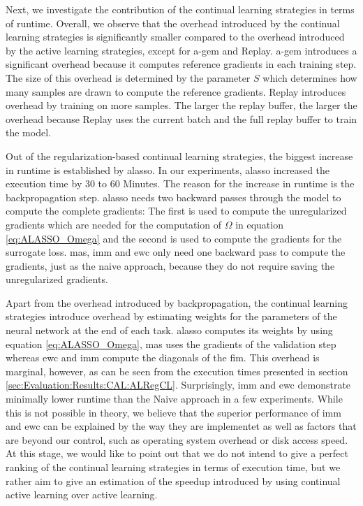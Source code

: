 Next, we investigate the contribution of the continual learning strategies in terms of runtime. Overall, we observe that the overhead introduced by the
continual learning strategies is significantly smaller compared to the overhead introduced by the active learning strategies, except for \gls{a-gem}
and Replay. \gls{a-gem} introduces a significant overhead because it computes reference gradients in each training step. The size of this overhead is
determined by the parameter $S$ which determines how many samples are drawn to compute the reference gradients. Replay introduces overhead by training
on more samples. The larger the replay buffer, the larger the overhead because Replay uses the current batch and the full replay buffer to train the model.

Out of the regularization-based continual learning strategies, the biggest increase in runtime is established by \gls{alasso}. In our experiments,
\gls{alasso} increased the execution time by 30 to 60 Minutes. The reason for the increase in runtime is the backpropagation step. \gls{alasso} needs
two backward passes through the model to compute the complete gradients: The first is used to compute the unregularized gradients which are needed for
the computation of $\Omega$ in equation \ref{eq:ALASSO_Omega} and the second is used to compute the gradients for the surrogate loss. \gls{mas},
\gls{imm} and \gls{ewc} only need one backward pass to compute the gradients, just as the naive approach, because they do not require saving the
unregularized gradients. \par
Apart from the overhead introduced by backpropagation, the continual learning strategies introduce overhead by estimating weights for the parameters of
the neural network at the end of each task. \gls{alasso} computes its weights by using equation \ref{eq:ALASSO_Omega}, \gls{mas} uses the gradients of
the validation step whereas \gls{ewc} and \gls{imm} compute the diagonals of the \gls{fim}. This overhead is marginal, however, as can be seen from the
execution times presented in section \ref{sec:Evaluation:Results:CAL:ALRegCL}. Surprisingly, \gls{imm} and \gls{ewc} demonstrate minimally lower runtime
than the Naive approach in a few experiments. While this is not possible in theory, we believe that the superior performance of \gls{imm} and \gls{ewc}
can be explained by the way they are implementet as well as factors that are beyond our control, such as operating system overhead or disk access speed.
At this stage, we would like to point out that we do not intend to give a perfect ranking of the continual learning strategies in terms of execution time,
but we rather aim to give an estimation of the speedup introduced by using continual active learning over active learning. \par



